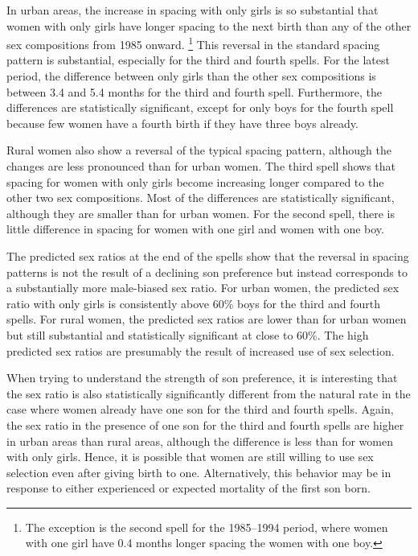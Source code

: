 \documentclass[12pt,letterpaper]{article}
\begin{document}
In urban areas, the increase in spacing with only girls is so 
substantial that women with only girls have longer spacing to the 
next birth than any of the other sex compositions from 1985 onward.%
\footnote{
The exception is the second spell for the 1985--1994 period, where women
with one girl have 0.4 months longer spacing the women with one boy.
}
This reversal in the standard spacing pattern is substantial, 
especially for the third and fourth spells.
For the latest period, the difference between only girls than the
other sex compositions is between 3.4 and 5.4 months for the third
and fourth spell.
Furthermore, the differences are statistically significant, except
for only boys for the fourth spell because few women have a fourth
birth if they have three boys already.

Rural women also show a reversal of the typical spacing pattern,
although the changes are less pronounced than for urban women.
The third spell shows that spacing for women with only girls become
increasing longer compared to the other two sex compositions.
Most of the differences are statistically significant, although they are 
smaller than for urban women.
For the second spell, there is little difference in spacing for
women with one girl and women with one boy.

The predicted sex ratios at the end of the spells show that
the reversal in spacing patterns is not the result of a declining son
preference but instead corresponds to a substantially more male-biased 
sex ratio.
For urban women, the predicted sex ratio with only girls 
is consistently above 60\% boys for the third and fourth spells.
For rural women, the predicted sex ratios are lower than for urban
women but still substantial and statistically significant at close 
to 60\%.
The high predicted sex ratios are presumably the result of increased 
use of sex selection.

When trying to understand the strength of son preference, it is interesting
that the sex ratio is also statistically significantly different
from the natural rate in the case where women already have one
son for the third and fourth spells.
Again, the sex ratio in the presence of one son for the third and
fourth spells are higher in urban areas than rural areas, although
the difference is less than for women with only girls.
Hence, it is possible that women are still willing to use sex selection
even after giving birth to one. 
Alternatively, this behavior may be in response to either experienced
or expected mortality of the first son born.
\end{document}
